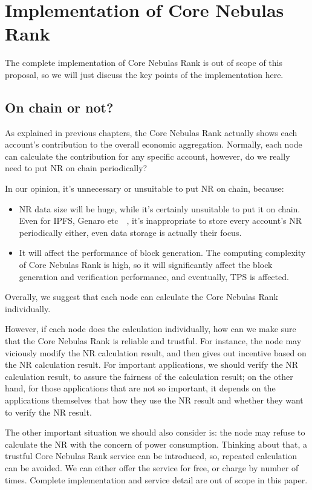 \section{Implementation of Core Nebulas Rank}
The complete implementation of Core Nebulas Rank is out of scope of this proposal, so we will just discuss the key points of the implementation here.

\subsection{On chain or not? \label{sec:onchain}}
As explained in previous chapters, the Core Nebulas Rank actually shows each account’s contribution to the overall economic aggregation. Normally, each node can calculate the contribution for any specific account, however, do we really need to put NR on chain periodically?

In our opinion, it’s unnecessary or unsuitable to put NR on chain, because:
\begin{itemize}
\item NR data size will be huge, while it’s certainly unsuitable to put it on chain. Even for  IPFS, Genaro etc~\cite{IPFS}~\cite{Genaro}, it’s inappropriate to store every account’s NR periodically either, even data storage is actually their focus. 
\item It will affect the performance of block generation. The computing complexity of Core Nebulas Rank is high, so it will significantly affect the block generation and verification performance, and eventually, TPS is affected.
\end{itemize}
\noindent Overally, we suggest that each node can calculate the Core Nebulas Rank individually.

However, if each node does the calculation individually, how can we make sure that the Core Nebulas Rank is reliable and trustful. For instance, the node may viciously modify the NR calculation result, and then gives out incentive based on the NR calculation result. For important applications, we should verify the NR calculation result, to assure the fairness of the calculation result; on the other hand, for those applications that are not so important, it depends on the applications themselves that how they use the NR result and whether they want to verify the NR result.

The other important situation we should also consider is: the node may refuse to calculate the NR with the concern of power consumption. Thinking about that, a trustful Core Nebulas Rank service can be introduced, so, repeated calculation can be avoided. We can either offer the service for free, or charge by number of times. Complete implementation and service detail are out of scope in this paper.


